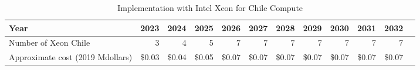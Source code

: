 \tiny \begin{longtable} { |p{}  |r  |r  |r  |r  |r  |r  |r  |r  |r  |r  |r |} 
\caption{Implementation with Intel Xeon for Chile Compute \label{tab:opsXeonChile}}\\ 
\hline 
\textbf{Year}&\textbf{2023}&\textbf{2024}&\textbf{2025}&\textbf{2026}&\textbf{2027}&\textbf{2028}&\textbf{2029}&\textbf{2030}&\textbf{2031}&\textbf{2032} \\ \hline
{Number of Xeon Chile}&{3}&{4}&{5}&{7}&{7}&{7}&{7}&{7}&{7}&{7} \\ \hline
{Approximate cost (2019 Mdollars)}&{\$0.03}&{\$0.04}&{\$0.05}&{\$0.07}&{\$0.07}&{\$0.07}&{\$0.07}&{\$0.07}&{\$0.07}&{\$0.07} \\ \hline
\end{longtable} \normalsize
